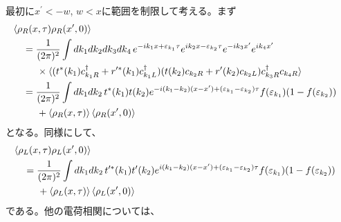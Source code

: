 \documentclass[10pt,a4j]{jarticle}
\begin{document}
最初に$x^\prime<-w$, $w<x$に範囲を制限して考える。まず
\begin{align}
& \hspace{-4mm} \braket{\rho_{R}(x,\tau) \rho_{R}(x^\prime,0)} \nonumber \\
&= \frac{1}{(2\pi)^2} \int dk_1 dk_2 dk_3 dk_4 \,
e^{-ik_1x+\varepsilon_{k_1}\tau}e^{ik_2x-\varepsilon_{k_2}\tau}e^{-ik_3x^\prime}e^{ik_4x^\prime} \nonumber \\
& \hspace{5mm} \times  \braket{ (t^{*} (k_1)c^\dagger_{k_1R} + r^{\prime*}(k_1) c^\dagger_{k_1L})  (t(k_2) c_{k_2R} 
+ r^\prime(k_2) c_{k_2L}) c^\dagger_{k_3R} c_{k_4R} } \nonumber \\
&=  \frac{1}{(2\pi)^2} \int dk_1 dk_2 \,
t^{*} (k_1)t(k_2)e^{-i(k_1-k_2)(x-x^\prime) 
+ (\varepsilon_{k_1} - \varepsilon_{k_2})\tau}f(\varepsilon_{k_1})(1 - f(\varepsilon_{k_2})) \nonumber \\
& \hspace{5mm} + \braket{\rho_{R}(x,\tau)}  \braket{ \rho_{R}(x^\prime,0)}  
\end{align}
となる。同様にして、
\begin{align}
& \hspace{-4mm} \braket{\rho_{L}(x,\tau) \rho_{L}(x^\prime,0)} \nonumber \\  
&= \frac{1}{(2\pi)^2} \int dk_1 dk_2 \,
t^{\prime*} (k_1)t^\prime(k_2)e^{i(k_1-k_2)(x-x^\prime) + (\varepsilon_{k_1} - \varepsilon_{k_2})\tau}f(\varepsilon_{k_1})(1 - f(\varepsilon_{k_2})) \nonumber \\
& \hspace{5mm} + \braket{\rho_{L}(x,\tau)}  \braket{ \rho_{L}(x^\prime,0)}  
\end{align}
である。他の電荷相関については、
\end{document}
